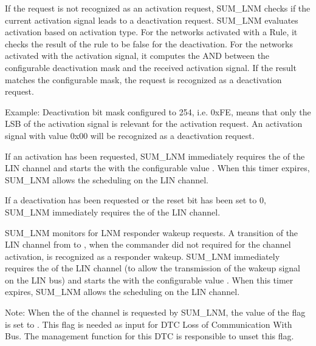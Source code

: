 {
If the request is not recognized as an activation request, SUM_LNM checks if the current activation signal leads to a deactivation request. 
SUM_LNM evaluates activation based on activation type. For the networks activated with a Rule, it checks the result of the rule to be false for the deactivation. For the networks activated with the activation signal, it computes the AND between the configurable deactivation mask and the received activation signal. If the result matches the configurable mask, the request is recognized as a deactivation request.

Example: Deactivation bit mask configured to 254, i.e. 0xFE, means that only the LSB of the activation signal is relevant for the activation request. 
An activation signal with value 0x00 will be recognized as a deactivation request.
}
{  }

{
If an activation has been requested, SUM_LNM immediately requires the  of the LIN channel and starts the  with the configurable value . When this timer expires,
SUM_LNM allows the scheduling on the LIN channel.
}
{   }

{
If a deactivation has been requested or the reset bit has been set to 0, SUM_LNM immediately requires the  of the LIN channel.
}
{ }

{
SUM_LNM monitors for LNM responder wakeup requests. A transition of the LIN channel from  to , when the commander did not required for the channel activation, 
is recognized as a responder wakeup. SUM_LNM immediately requires the  of the LIN channel (to allow the transmission of the wakeup signal on the LIN bus) and starts the 
with the configurable value . When this timer expires, SUM_LNM allows the scheduling on the LIN channel.
}
{   }

Note: When the  of the channel is requested by SUM_LNM, the value of the flag  is set to . This flag is needed as input for DTC Loss of Communication With Bus. 
The management function for this DTC is responsible to unset this flag.

